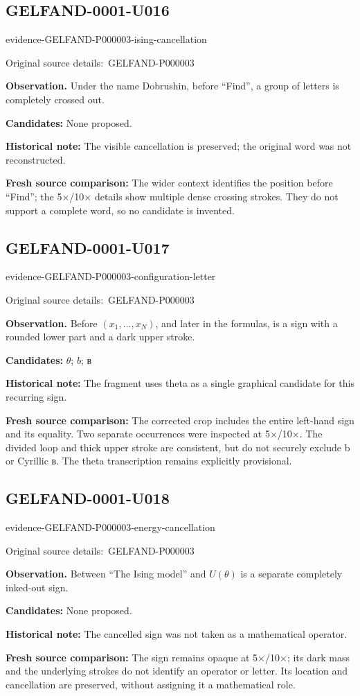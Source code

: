 \documentclass[11pt]{article}
\newcommand{\EvidenceBlock}[4]{%
 \par\smallskip\noindent\begin{minipage}{\linewidth}
 \begin{minipage}[t]{.47\linewidth}\vspace{0pt}\centering
 \csname evidence-#1-#2\endcsname\par
 {\scriptsize\SourceCropCaption\ #1}\par
 \end{minipage}\hfill
 \begin{minipage}[t]{.49\linewidth}\vspace{0pt}\raggedright
 {\small\color{orange!65!black}\textbf{#4} #3}\par
 \end{minipage}
 \end{minipage}\par\smallskip}
\newcommand{\SourceCropCaption}{Original source details:}\newcommand{\ReadingCaption}{Uncertain reading.}\newcommand{\IncompleteCaption}{Undeciphered passage.}\newcommand{\DiagramCaption}{Diagram and typed description.}
\begin{document}
\subsection*{GELFAND-0001-U016}
\EvidenceBlock{GELFAND-P000003}{ising-cancellation}{Under the name Dobrushin, before “Find”, a group of letters is completely crossed out.}{Observation.}
\par\smallskip\noindent\textbf{Candidates: } None proposed.\par
\par\smallskip\noindent\textbf{Historical note: } The visible cancellation is preserved; the original word was not reconstructed.\par
\par\smallskip\noindent\textbf{Fresh source comparison: } The wider context identifies the position before “Find”; the 5×/10× details show multiple dense crossing strokes. They do not support a complete word, so no candidate is invented.\par

\subsection*{GELFAND-0001-U017}
\EvidenceBlock{GELFAND-P000003}{configuration-letter}{Before \((x_1,\ldots,x_N)\), and later in the formulas, is a sign with a rounded lower part and a dark upper stroke.}{Observation.}
\par\smallskip\noindent\textbf{Candidates: } \(\theta\); \(b\); в\par
\par\smallskip\noindent\textbf{Historical note: } The fragment uses theta as a single graphical candidate for this recurring sign.\par
\par\smallskip\noindent\textbf{Fresh source comparison: } The corrected crop includes the entire left-hand sign and its equality. Two separate occurrences were inspected at 5×/10×. The divided loop and thick upper stroke are consistent, but do not securely exclude b or Cyrillic в. The theta transcription remains explicitly provisional.\par

\subsection*{GELFAND-0001-U018}
\EvidenceBlock{GELFAND-P000003}{energy-cancellation}{Between “The Ising model” and \(U(\theta)\) is a separate completely inked-out sign.}{Observation.}
\par\smallskip\noindent\textbf{Candidates: } None proposed.\par
\par\smallskip\noindent\textbf{Historical note: } The cancelled sign was not taken as a mathematical operator.\par
\par\smallskip\noindent\textbf{Fresh source comparison: } The sign remains opaque at 5×/10×; its dark mass and the underlying strokes do not identify an operator or letter. Its location and cancellation are preserved, without assigning it a mathematical role.\par
\end{document}
